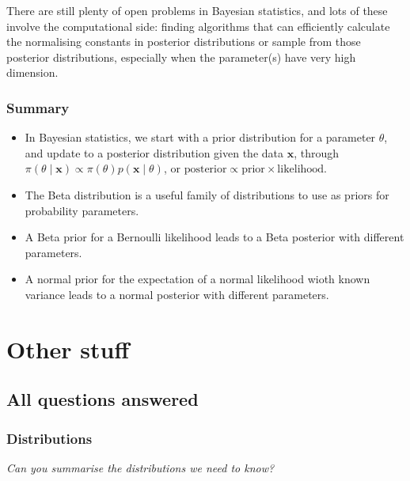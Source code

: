 \documentclass[
  letterpaper,
]{report}
\providecommand{\tightlist}{%
  \setlength{\itemsep}{0pt}\setlength{\parskip}{0pt}}\usepackage{longtable,booktabs,array}
\theoremstyle{definition}
\theoremstyle{definition}
\theoremstyle{remark}
\begin{document}
There are still plenty of open problems in Bayesian statistics, and lots
of these involve the computational side: finding algorithms that can
efficiently calculate the normalising constants in posterior
distributions or sample from those posterior distributions, especially
when the parameter(s) have very high dimension.

\hypertarget{summary-10}{%
\section*{Summary}\label{summary-10}}


\begin{itemize}
\tightlist
\item
  In Bayesian statistics, we start with a prior distribution for a
  parameter \(\theta\), and update to a posterior distribution given the
  data \(\mathbf x\), through
  \(\pi(\theta \mid \mathbf x) \propto \pi(\theta)p(\mathbf x \mid \theta)\),
  or \(\text{posterior} \propto \text{prior} \times \text{likelihood}\).
\item
  The Beta distribution is a useful family of distributions to use as
  priors for probability parameters.
\item
  A Beta prior for a Bernoulli likelihood leads to a Beta posterior with
  different parameters.
\item
  A normal prior for the expectation of a normal likelihood wioth known
  variance leads to a normal posterior with different parameters.
\end{itemize}

\part{Other stuff}

\hypertarget{L21-questions}{%
\chapter{All questions answered}\label{L21-questions}}

\hypertarget{faq-R-RV}{%
\section{Distributions}\label{faq-R-RV}}

\emph{Can you summarise the distributions we need to know?}
\end{document}
